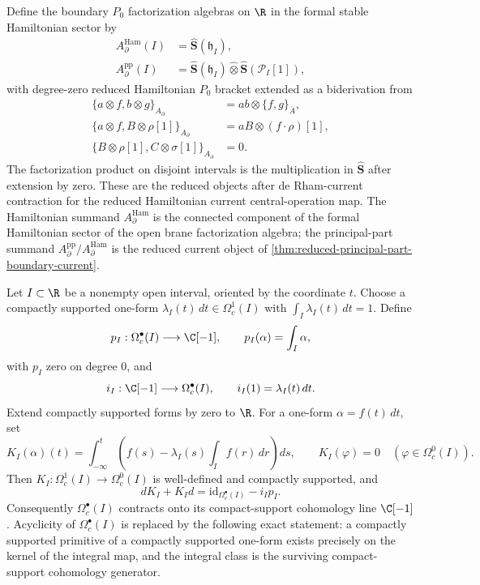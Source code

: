 \documentclass[11pt]{memoir}
\begin{document}
\begin{constr}
  Define the boundary $P_0$ factorization algebras on $\R$ in the
  formal stable Hamiltonian sector by
  \begin{align*}
    A_\partial^{\mathrm{Ham}}(I)
      &=\widehat{\mathbf S}(\mathfrak h_I),\\
    A_\partial^{\mathrm{pp}}(I)
      &=\widehat{\mathbf S}(\mathfrak h_I)\widehat\otimes
        \widehat{\mathbf S}(\mathcal P_I[1]),
  \end{align*}
  with degree-zero reduced Hamiltonian \(P_0\) bracket extended as a
  biderivation from
  \begin{align*}
    \{a\otimes f,b\otimes g\}_{A_\partial}&=ab\otimes\{f,g\}_{\bar A},\\
    \{a\otimes f,B\otimes\rho[1]\}_{A_\partial}
      &=aB\otimes(f\cdot\rho)[1],\\
    \{B\otimes\rho[1],C\otimes\sigma[1]\}_{A_\partial}&=0.
  \end{align*}
  The factorization product on disjoint intervals is the multiplication
  in $\widehat{\mathbf S}$ after extension by zero. These are the
  reduced objects after de Rham-current contraction for the reduced
  Hamiltonian current central-operation map. The Hamiltonian summand
  $A_\partial^{\mathrm{Ham}}$ is the connected component of the formal
  Hamiltonian sector of the open brane factorization algebra; the
  principal-part summand
  $A_\partial^{\mathrm{pp}}/A_\partial^{\mathrm{Ham}}$ is the reduced
  current object of
    \ref{thm:reduced-principal-part-boundary-current}.
\end{constr}

\begin{lem}
  \label{lem:compact-support-interval-contraction}
  Let \(I\subset\R\) be a nonempty open interval, oriented by the coordinate
  \(t\). Choose a compactly supported one-form
  \(\lambda_I(t)\,dt\in\Omega^1_c(I)\) with
  \(\int_I\lambda_I(t)\,dt=1\). Define
  \[
    p_I:\Omega_c^\bullet(I)\longrightarrow\C[-1],\qquad
    p_I(\alpha)=\int_I\alpha,
  \]
  with \(p_I\) zero on degree \(0\), and
  \[
    i_I:\C[-1]\longrightarrow\Omega_c^\bullet(I),\qquad
    i_I(1)=\lambda_I(t)\,dt.
  \]
  Extend compactly supported forms by zero to \(\R\). For a one-form
  \(\alpha=f(t)\,dt\), set
  \[
    K_I(\alpha)(t)
      =
      \int_{-\infty}^{t}
      \left(f(s)-\lambda_I(s)\int_I f(r)\,dr\right)ds,
    \qquad
    K_I(\varphi)=0\quad(\varphi\in\Omega^0_c(I)).
  \]
  Then \(K_I:\Omega^1_c(I)\to\Omega^0_c(I)\) is well-defined and
  compactly supported, and
  \[
    dK_I+K_I d=\mathrm{id}_{\Omega_c^\bullet(I)}-i_Ip_I.
  \]
  Consequently \(\Omega_c^\bullet(I)\) contracts onto its compact-support
  cohomology line \(\C[-1]\). Acyclicity of
  \(\Omega_c^\bullet(I)\) is replaced by the following exact statement:
  a compactly supported primitive
  of a compactly supported one-form exists precisely on the kernel of
  the integral map, and the integral class is the surviving
  compact-support cohomology generator.
\end{lem}
\end{document}
